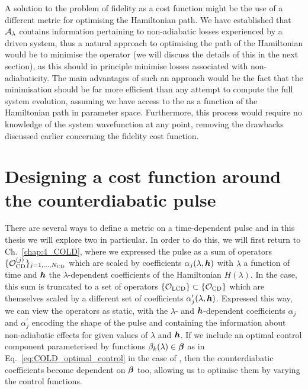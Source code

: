 A solution to the problem of fidelity as a cost function might be the use of a different metric for optimising the Hamiltonian path. We have established that $\mathcal{A}_{\lambda}$ contains information pertaining to non-adiabatic losses experienced by a driven system, thus a natural approach to optimising the path of the Hamiltonian would be to minimise the  operator (we will discuss the details of this in the next section), as this should in principle minimise losses associated with non-adiabaticity. The main advantages of such an approach would be the fact that  the minimisation should be far more efficient than any attempt to compute the full system evolution, assuming we have access to the  as a function of the Hamiltonian path in parameter space. Furthermore, this process would require no knowledge of the system wavefunction at any point, removing the drawbacks discussed earlier concerning the fidelity cost function.

\section{Designing a cost function around the counterdiabatic pulse}\label{sec:5.2_designing_costfunc_hocd}

There are several ways to define a metric on a time-dependent pulse and in this thesis we will explore two in particular. In order to do this, we will first return to Ch.~\ref{chap:4_COLD}, where we expressed the  pulse as a sum of operators $\{\mathcal{O}_{\rm CD}^{(j)}\}_{j = 1, ..., N_{\rm CD}}$ which are scaled by coefficients $\alpha_j(\lambda, \boldsymbol{h})$ with $\lambda$ a function of time and $\boldsymbol{h}$ the $\lambda$-dependent coefficients of the Hamiltonian $H(\lambda)$. In the  case, this sum is truncated to a set of operators $\{\mathcal{O}_{\rm LCD}\} \subset \{\mathcal{O}_{\rm CD}\}$ which are themselves scaled by a different set of coefficients $\alpha_j^{\prime}(\lambda, \boldsymbol{h})$. Expressed this way, we can view the operators as static, with the $\lambda$- and $\boldsymbol{h}$-dependent coefficients $\alpha_j$ and $\alpha_j^{\prime}$ encoding the shape of the pulse and containing the information about non-adiabatic effects for given values of $\lambda$ and $\boldsymbol{h}$. If we include an optimal control component parameterised by functions $\beta_k(\lambda) \in \boldsymbol{\beta}$ as in Eq.~\eqref{eq:COLD_optimal_control} in the case of , then the counterdiabatic coefficients become dependent on $\boldsymbol{\beta}$ too, allowing us to optimise them by varying the control functions.

